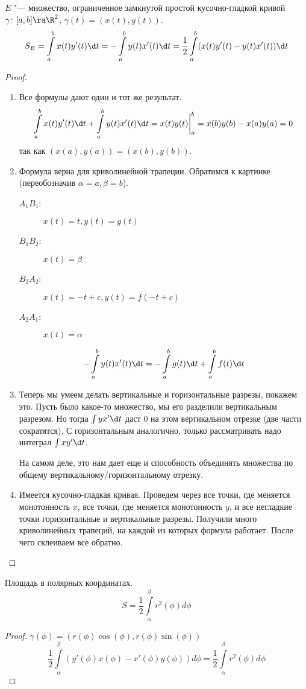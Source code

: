 \begin{theorem}
	$E$ "--- множество, ограниченное замкнутой простой кусочно-гладкой кривой $\gamma \colon [a,b] \ra \R^2$, $\gamma(t) = (x(t), y(t))$.
	\[ S_E = \int\limits_a^b x(t)y'(t)\d t = -\int\limits_a^b y(t)x'(t) \d t = \frac{1}{2} \int\limits_a^b (x(t)y'(t) - y(t)x'(t))\d t \]
\end{theorem}
\begin{proof}
	\begin{enumerate}
	\item
		Все формулы дают один и тот же результат.
		\[ \int\limits_a^b x(t)y'(t) \d t + \int\limits_a^b y(t)x'(t) \d t = x(t)y(t) \bigg|_a^b = x(b)y(b) - x(a)y(a) = 0 \]
		так как $(x(a), y(a)) = (x(b), y(b))$.

	\item
		Формула верна для криволинейной трапеции. Обратимся к картинке (переобозначив $\alpha = a, \beta = b$).
		\begin{description}
			\item[$A_1B_1$:] $x(t) = t, y(t) = g(t)$
			\item[$B_1B_2$:] $x(t) = \beta$
			\item[$B_2A_2$:] $x(t) = -t + c, y(t) = f(-t + c)$
			\item[$A_2A_1$:] $x(t) = \alpha$
		\end{description}
		\[ -\int\limits_a^b y(t)x'(t) \d t = -\int\limits_a^b g(t) \d t + \int\limits_a^b f(t) \d t \]

	\item
		Теперь мы умеем делать вертикальные и горизонтальные разрезы, покажем это.
		Пусть было какое-то множество, мы его разделили вертикальным разрезом.
		Но тогда $\int y x' \d t$ даст 0 на этом вертикальном отрезке (две части сократятся).
		С горизонтальным аналогично, только рассматривать надо интеграл $\int x y' \d t$.

		На самом деле, это нам дает еще и способность объединять множества по общему вертикальному/горизонтальному отрезку.

	\item
		Имеется кусочно-гладкая кривая.
		Проведем через все точки, где меняется монотонность $x$, все точки, где меняется монотонность $y$, и все негладкие точки горизонтальные и вертикальные разрезы.
		Получили много криволинейных трапеций, на каждой из которых формула работает.
		После чего склеиваем все обратно.
	\end{enumerate}
\end{proof}

\begin{conseq}
	Площадь в полярных координатах.
	\[ S = \frac{1}{2}\int\limits_\alpha^\beta r^2(\phi) d\phi \]
\end{conseq}
\begin{proof}
	$\gamma(\phi) = (r(\phi)\cos(\phi), r(\phi)\sin(\phi))$
	\[ \frac{1}{2} \int\limits_\alpha^\beta (y'(\phi)x(\phi) - x'(\phi)y(\phi)) d\phi = \frac{1}{2} \int\limits_\alpha^\beta r^2(\phi) d\phi \]
\end{proof}
